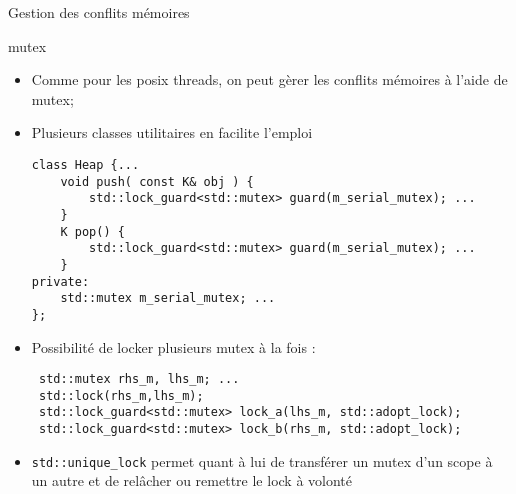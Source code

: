 \documentclass[handout,10pt]{beamer}
\begin{document}
\begin{frame}[fragile]{Gestion des conflits mémoires}
\tiny
\begin{block}{mutex}
 \begin{itemize}
  \item Comme pour les posix threads, on peut gèrer les conflits mémoires à l'aide de mutex;
  \item Plusieurs classes utilitaires en facilite l'emploi
\begin{lstlisting}
class Heap {...
    void push( const K& obj ) {
        std::lock_guard<std::mutex> guard(m_serial_mutex); ...
    }
    K pop() {
        std::lock_guard<std::mutex> guard(m_serial_mutex); ...
    }    
private:
    std::mutex m_serial_mutex; ...
};
\end{lstlisting}
 \item Possibilité de locker plusieurs mutex à la fois :
\begin{lstlisting}
 std::mutex rhs_m, lhs_m; ...
 std::lock(rhs_m,lhs_m);
 std::lock_guard<std::mutex> lock_a(lhs_m, std::adopt_lock);
 std::lock_guard<std::mutex> lock_b(rhs_m, std::adopt_lock); 
\end{lstlisting}
\item \lstinline$std::unique_lock$ permet quant à lui de transférer un mutex d'un scope à un autre et de relâcher ou remettre le lock à volonté
 \end{itemize}
\end{block}
 
\end{frame}
\end{document}
